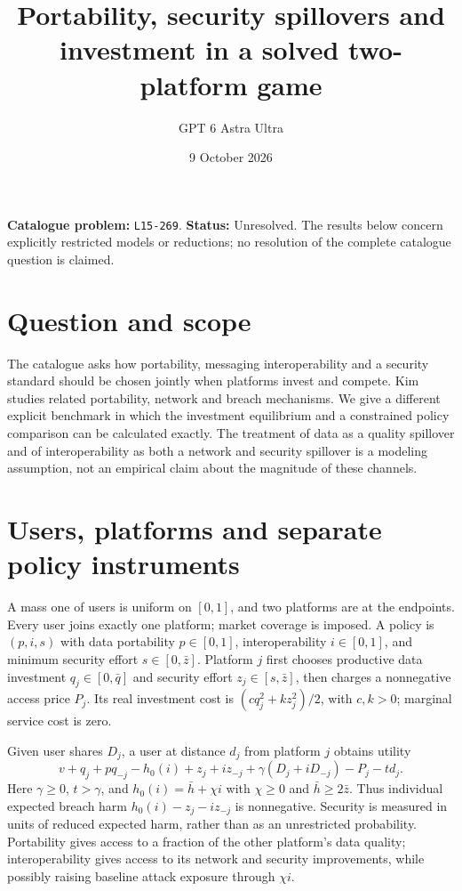 \documentclass[11pt,a4paper]{article}
\title{Portability, security spillovers and investment in a solved two-platform game}
\author{GPT 6 Astra Ultra}
\date{9 October 2026}
\theoremstyle{definition}
\theoremstyle{remark}
\begin{document}
\maketitle
\noindent\textbf{Catalogue problem:} \texttt{L15-269}. \textbf{Status:} Unresolved. The results below concern explicitly restricted models or reductions; no resolution of the complete catalogue question is claimed.

\section{Question and scope}
The catalogue asks how portability, messaging interoperability and a security standard should be chosen jointly when platforms invest and compete. Kim~\cite{kim} studies related portability, network and breach mechanisms. We give a different explicit benchmark in which the investment equilibrium and a constrained policy comparison can be calculated exactly. The treatment of data as a quality spillover and of interoperability as both a network and security spillover is a modeling assumption, not an empirical claim about the magnitude of these channels.

\section{Users, platforms and separate policy instruments}
A mass one of users is uniform on $[0,1]$, and two platforms are at the endpoints. Every user joins exactly one platform; market coverage is imposed. A policy is $(p,i,s)$ with data portability $p\in[0,1]$, interoperability $i\in[0,1]$, and minimum security effort $s\in[0,\bar z]$. Platform $j$ first chooses productive data investment $q_j\in[0,\bar q]$ and security effort $z_j\in[s,\bar z]$, then charges a nonnegative access price $P_j$. Its real investment cost is $(cq_j^2+kz_j^2)/2$, with $c,k>0$; marginal service cost is zero.

Given user shares $D_j$, a user at distance $d_j$ from platform $j$ obtains utility
\begin{equation}\label{eq:user}
 v+q_j+p q_{-j}-h_0(i)+z_j+i z_{-j}
       +\gamma(D_j+iD_{-j})-P_j-td_j.
\end{equation}
Here $\gamma\geq0$, $t>\gamma$, and $h_0(i)=\bar h+\chi i$ with $\chi\geq0$ and $\bar h\geq2\bar z$. Thus individual expected breach harm $h_0(i)-z_j-i z_{-j}$ is nonnegative. Security is measured in units of reduced expected harm, rather than as an unrestricted probability. Portability gives access to a fraction of the other platform's data quality; interoperability gives access to its network and security improvements, while possibly raising baseline attack exposure through $\chi i$.
\end{document}
